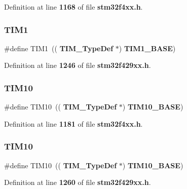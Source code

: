 Definition at line \textbf{ 1168} of file \textbf{ stm32f4xx.\+h}.

\mbox{\label{group__Peripheral__declaration_ga2e87451fea8dc9380056d3cfc5ed81fb}} 
\subsubsection{T\+I\+M1\hspace{0.1cm}{\footnotesize\ttfamily [2/2]}}
{\footnotesize\ttfamily \#define T\+I\+M1~((\textbf{ T\+I\+M\+\_\+\+Type\+Def} $\ast$) \textbf{ T\+I\+M1\+\_\+\+B\+A\+SE})}



Definition at line \textbf{ 1246} of file \textbf{ stm32f429xx.\+h}.

\mbox{\label{group__Peripheral__declaration_ga46b2ad3f5f506f0f8df0d2ec3e767267}} 
\subsubsection{T\+I\+M10\hspace{0.1cm}{\footnotesize\ttfamily [1/2]}}
{\footnotesize\ttfamily \#define T\+I\+M10~((\textbf{ T\+I\+M\+\_\+\+Type\+Def} $\ast$) \textbf{ T\+I\+M10\+\_\+\+B\+A\+SE})}



Definition at line \textbf{ 1181} of file \textbf{ stm32f4xx.\+h}.

\mbox{\label{group__Peripheral__declaration_ga46b2ad3f5f506f0f8df0d2ec3e767267}} 
\subsubsection{T\+I\+M10\hspace{0.1cm}{\footnotesize\ttfamily [2/2]}}
{\footnotesize\ttfamily \#define T\+I\+M10~((\textbf{ T\+I\+M\+\_\+\+Type\+Def} $\ast$) \textbf{ T\+I\+M10\+\_\+\+B\+A\+SE})}



Definition at line \textbf{ 1260} of file \textbf{ stm32f429xx.\+h}.

